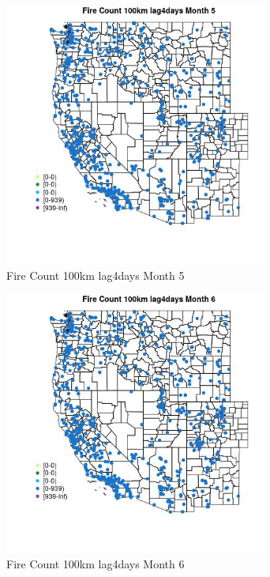 \begin{figure} 
\centering  
\includegraphics[width=0.77\textwidth]{Code_Outputs/Report_ML_input_PM25_Step4_part_e_de_duplicated_aves_compiled_2019-05-21wNAs_MapObsMo5Fire_Count_100km_lag4days.jpg} 
\caption{\label{fig:Report_ML_input_PM25_Step4_part_e_de_duplicated_aves_compiled_2019-05-21wNAsMapObsMo5Fire_Count_100km_lag4days}Fire Count 100km lag4days Month 5} 
\end{figure} 
 

\begin{figure} 
\centering  
\includegraphics[width=0.77\textwidth]{Code_Outputs/Report_ML_input_PM25_Step4_part_e_de_duplicated_aves_compiled_2019-05-21wNAs_MapObsMo6Fire_Count_100km_lag4days.jpg} 
\caption{\label{fig:Report_ML_input_PM25_Step4_part_e_de_duplicated_aves_compiled_2019-05-21wNAsMapObsMo6Fire_Count_100km_lag4days}Fire Count 100km lag4days Month 6} 
\end{figure} 
 

